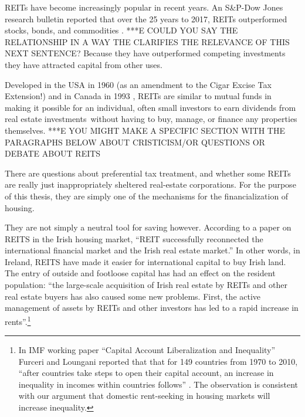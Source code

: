 REITs have become increasingly popular in recent years.  An S\&P-Dow Jones research bulletin reported that over the  25 years to 2017, REITs outperformed stocks, bonds, and commodities \cite{GET-Dow-Jones-research-bulletin}. ***E COULD YOU SAY THE RELATIONSHIP IN A WAY THE CLARIFIES THE RELEVANCE OF THIS NEXT SENTENCE? %
Because they have outperformed competing investments they have attracted  capital from other uses.

Developed in the USA  in 1960 (as an amendment to the Cigar Excise Tax Extension!) and in Canada in 1993 \cite{GET_REITsDevelopedDates}, REITs are similar to mutual funds in making it possible for an individual, often small investors to earn dividends from real estate investments without having to buy, manage, or finance any properties themselves. 
***E YOU MIGHT MAKE A SPECIFIC SECTION WITH THE PARAGRAPHS BELOW ABOUT CRISTICISM/OR QUESTIONS OR DEBATE ABOUT REITS %

There are questions about preferential tax treatment, and whether some REITs are really just inappropriately sheltered real-estate corporations.  For the purpose of this thesis, they are simply one of the mechanisms for the financialization of housing.

They are not simply a neutral tool for saving however. According to a paper \cite{wangAnalyzeImpactREITs2021} on REITS in the Irish housing market, ``REIT successfully reconnected the international financial market and the Irish real estate market.'' In other words, in Ireland, REITS have made it easier for international capital to buy Irish land. The entry of outside and footloose capital has had an effect on the resident population:  ``the large-scale acquisition of Irish real estate by REITs and other real estate buyers has also caused some new problems. First, the active management of assets by REITs and other investors has led to a rapid increase in rents''.\footnote{In  IMF working paper ``Capital Account Liberalization and Inequality'' \cite{furceriCapitalAccountLiberalization2015}  Furceri and Loungani reported that that for 149 countries from 1970 to 2010, ``after countries take steps to open their capital account, an increase in inequality in incomes within countries follows'' . The observation is consistent with our argument  that domestic rent-seeking in housing markets will increase inequality.}   

